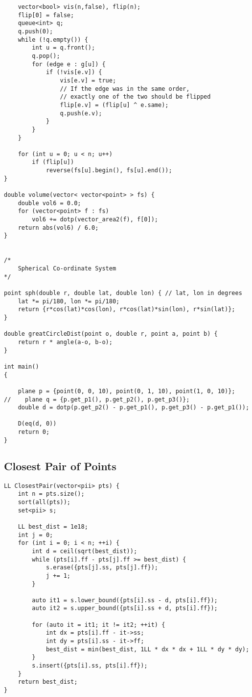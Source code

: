 \documentclass[10pt,a4paper,onesided]{article}
\begin{document}
\begin{multicols*}{3}
\begin{lstlisting}
    vector<bool> vis(n,false), flip(n);
    flip[0] = false;
    queue<int> q;
    q.push(0);
    while (!q.empty()) {
        int u = q.front();
        q.pop();
        for (edge e : g[u]) {
            if (!vis[e.v]) {
                vis[e.v] = true;
                // If the edge was in the same order,
                // exactly one of the two should be flipped
                flip[e.v] = (flip[u] ^ e.same);
                q.push(e.v);
            }
        }
    }

    for (int u = 0; u < n; u++)
        if (flip[u])
            reverse(fs[u].begin(), fs[u].end());
}

double volume(vector< vector<point> > fs) {
    double vol6 = 0.0;
    for (vector<point> f : fs)
        vol6 += dotp(vector_area2(f), f[0]);
    return abs(vol6) / 6.0;
}


/*
    Spherical Co-ordinate System
*/

point sph(double r, double lat, double lon) { // lat, lon in degrees
    lat *= pi/180, lon *= pi/180;
    return {r*cos(lat)*cos(lon), r*cos(lat)*sin(lon), r*sin(lat)};
}

double greatCircleDist(point o, double r, point a, point b) {
    return r * angle(a-o, b-o);
}

int main()
{

    plane p = {point(0, 0, 10), point(0, 1, 10), point(1, 0, 10)};
//    plane q = {p.get_p1(), p.get_p2(), p.get_p3()};
    double d = dotp(p.get_p2() - p.get_p1(), p.get_p3() - p.get_p1());

    D(eq(d, 0))
    return 0;
}

\end{lstlisting}
\subsection{Closest Pair of Points}
\begin{lstlisting}
LL ClosestPair(vector<pii> pts) {
    int n = pts.size();
    sort(all(pts));
    set<pii> s;

    LL best_dist = 1e18;
    int j = 0;
    for (int i = 0; i < n; ++i) {
        int d = ceil(sqrt(best_dist));
        while (pts[i].ff - pts[j].ff >= best_dist) {
            s.erase({pts[j].ss, pts[j].ff});
            j += 1;
        }

        auto it1 = s.lower_bound({pts[i].ss - d, pts[i].ff});
        auto it2 = s.upper_bound({pts[i].ss + d, pts[i].ff});

        for (auto it = it1; it != it2; ++it) {
            int dx = pts[i].ff - it->ss;
            int dy = pts[i].ss - it->ff;
            best_dist = min(best_dist, 1LL * dx * dx + 1LL * dy * dy);
        }
        s.insert({pts[i].ss, pts[i].ff});
    }
    return best_dist;
}
\end{lstlisting}

\end{multicols*}
\end{document}

